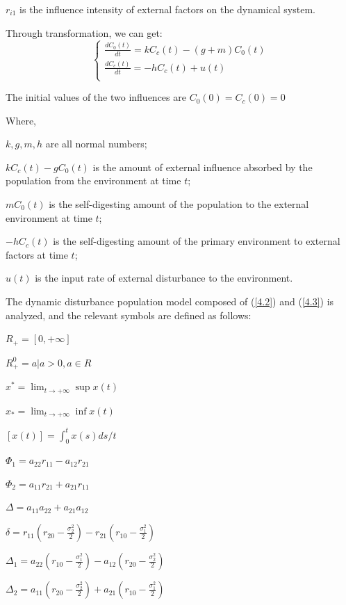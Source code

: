 $r_{i1}$ is the influence intensity of external factors on the dynamical system.

Through transformation, we can get:
\begin{equation}\label{4.3}
    \left\{
    \begin{array}{l}
        \frac{dC_{0}(t)}{dt}=kC_{c}(t)-(g+m)C_{0}(t) \\
        \frac{dC_{c}(t)}{dt}=-hC_{c}(t)+u(t) \\
    \end{array}
    \right.
    \end{equation}

The initial values of the two influences are $C_{0}(0)=C_{c}(0)=0$

Where,

$k,g,m,h$ are all normal numbers;

$kC_{c}(t)-gC_{0}(t)$ is the amount of external influence absorbed by the population from the environment at time $t$;

$mC_{0}(t)$ is the self-digesting amount of the population to the external environment at time $t$;

$-hC_{c}(t)$ is the self-digesting amount of the primary environment to external factors at time $t$;

$u(t)$ is the input rate of external disturbance to the environment.

The dynamic disturbance population model composed of (\ref{4.2}) and (\ref{4.3}) is analyzed, and the relevant symbols are defined as follows:

\begin{multicols}{2}
    $R_{+}=[0,+\infty ]$

    $R_{+}^0={a|a>0,a\in R}$

    $x^*=\lim_{t \to +\infty}\sup x(t)$

    $x_{*}=\lim_{t \to +\infty}\inf x(t)$

    $[x(t)]=\int_{0}^tx(s)ds / t $

    $\Phi_{1}=a_{22}r_{11}-a_{12}r_{21}$

    $\Phi_{2}=a_{11}r_{21}+a_{21}r_{11}$

    $\Delta =a_{11}a_{22}+a_{21}a_{12}$

    $\delta =r_{11}(r_{20}-\frac{\sigma_{2}^2}{2})-r_{21}(r_{10}-\frac{\sigma_{1}^2}{2})$

    $\Delta_{1} =a_{22}(r_{10}-\frac{\sigma_{1}^2}{2})-a_{12}(r_{20}-\frac{\sigma_{2}^2}{2})$

    $\Delta_{2} =a_{11}(r_{20}-\frac{\sigma_{2}^2}{2})+a_{21}(r_{10}-\frac{\sigma_{1}^2}{2})$
\end{multicols}

